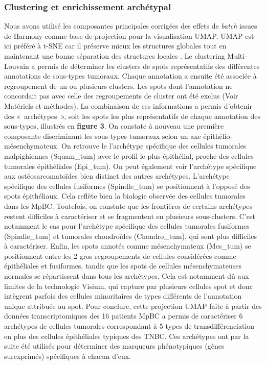 \documentclass[11pt]{article}
\begin{document}
\subsubsection{Clustering et enrichissement archétypal}

Nous avons utilisé les composantes principales corrigées des effets de \textit{batch} issues de Harmony comme base de projection pour la visualisation UMAP. UMAP est ici préféré à t-SNE car il préserve mieux les structures globales tout en maintenant une bonne séparation des structures locales \cite{McInnes2018UMAP}. Le clustering Multi-Louvain a permis de déterminer les clusters de spots représentatifs des différentes annotations de sous-types tumoraux. Chaque annotation a ensuite été associée à regroupement de un ou plusieurs clusters. Les spots dont l’annotation ne concordait pas avec celle des regroupements de cluster ont été exclus (Voir Matériels et méthodes). La combinaison de ces informations a permis d’obtenir des « archétypes », soit les spots les plus représentatifs de chaque annotation des sous-types, illustrés en \textbf{figure 3}. On constate à nouveau une première composante discriminant les sous-types tumoraux selon un axe épithélio-mésenchymateux. On retrouve le l’archétype spécifique des cellules tumorales malpighiennes (Squam\_tum) avec le profil le plus épithélial, proche des cellules tumorales épithéliales (Epi\_tum). On peut également voir l’archétype spécifique aux ostéosarcomatoïdes bien distinct des autres archétypes. L’archétype spécifique des cellules fusiformes (Spindle\_tum)  se positionnent à l’opposé des spots épithéliaux. Cela reflète bien la biologie observée des cellules tumorales dans les MpBC. Toutefois, on constate que les frontières de certains archétypes restent difficiles à caractériser et se fragmentent en plusieurs sous-clusters. C’est notamment le cas pour l’archétype spécifique des cellules tumorales fusiformes (Spindle\_tum) et tumorales chondroïdes (Chondro\_tum), qui sont plus difficiles à caractériser. Enfin, les spots annotés comme mésenchymateux (Mes\_tum) se positionnent entre les 2 gros regroupements de cellules considérées comme épithéliales et fusiformes, tandis que les spots de cellules mésenchymateuses normales se répartissent dans tous les archétypes. Cela est notamment dû aux limites de la technologie Visium, qui capture par plusieurs cellules spot et donc intègrent parfois des cellules minoritaires de types différents de l’annotation unique attribuée au spot. Pour conclure, cette projection UMAP faite à partir des données transcriptomiques des 16 patients MpBC a permis de caractériser 6 archétypes de cellules tumorales correspondant à 5 types de transdifférenciation en plus des cellules épithéliales typiques des TNBC. Ces archétypes ont par la suite été utilisés pour déterminer des marqueurs phénotypiques (gènes surexprimés) spécifiques à chacun d’eux.
\end{document}
